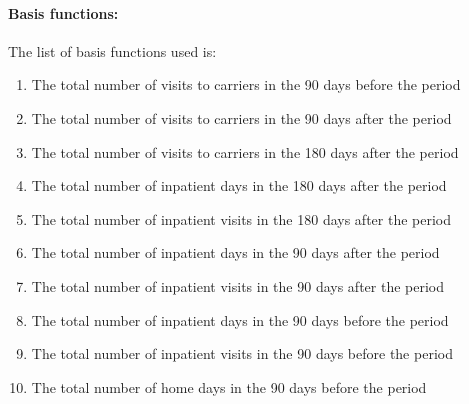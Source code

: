 \documentclass[12pt,a4paper]{article}
\begin{document}
\paragraph{\bf Basis functions:} The list of basis functions used is:
\begin{enumerate}
    \item The total number of visits to carriers in the 90 days before the period 
    \item The total number of visits to carriers in the 90 days after the period 
    \item The total number of visits to carriers in the 180 days after the period 
    \item The total number of inpatient days in the 180 days after the period 
    \item The total number of inpatient visits in the 180 days after the period 
    \item The total number of inpatient days in the 90 days after the period 
    \item The total number of inpatient visits in the 90 days after the period 
    \item The total number of inpatient days in the 90 days before the period 
    \item The total number of inpatient visits in the 90 days before the period 
    \item The total number of home days in the 90 days before the period 
\end{enumerate}
	
	
\end{document}
